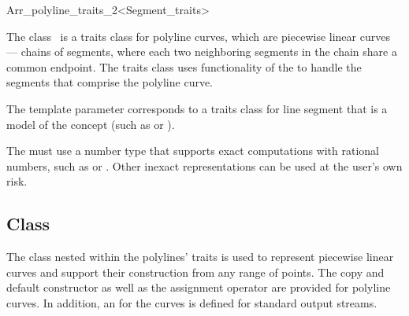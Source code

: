 
\ccRefPageBegin

\begin{ccRefClass}{Arr_polyline_traits_2<Segment_traits>}

\ccDefinition
    The class \ccRefName\ is a traits class for polyline curves, which are
    piecewise linear curves --- chains of segments, where each two neighboring
    segments in the chain share a common endpoint. The traits class uses
    functionality of the  to handle the segments that 
    comprise the polyline curve.

    The template parameter  corresponds to a traits class
    for line segment that is a model of the  concept 
    (such as  or 
    ).

    The  must use a number type that supports exact computations
    with rational numbers, such as  or 
    . Other inexact representations can be used at the 
    user's own risk.


\ccIsModel
     

%
\subsection*{Class }

The  class nested within the polylines' traits is used to
represent piecewise linear curves and support their construction from
any range of points. The copy and default constructor as well as 
the assignment operator are provided for polyline curves. In addition, 
an  for the curves is defined for standard output streams.


\end{ccRefClass}
